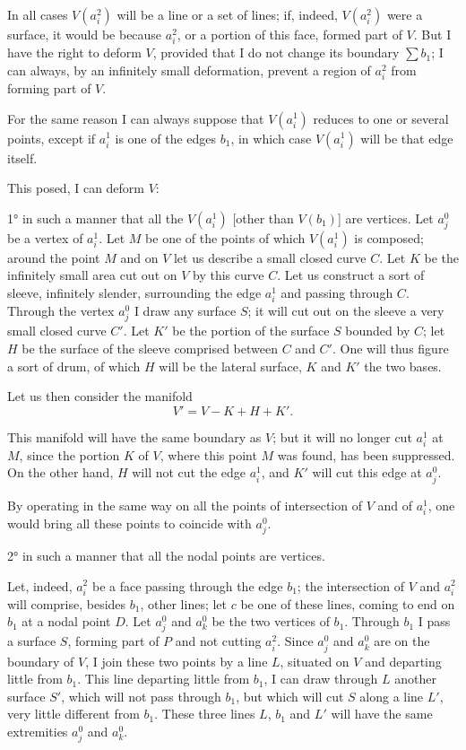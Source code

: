 \documentclass{article}
\begin{document}
In all cases $V(a^{2}_{i})$ will be a line or a set of lines; if, indeed, $V(a^{2}_{i})$ were a surface, it would be because $a^{2}_{i}$, or a portion of this face, formed part of $V$. But I have the right to deform $V$, provided that I do not change its boundary $\displaystyle\sum b_{1}$; I can always, by an infinitely small deformation, prevent a region of $a^{2}_{i}$ from forming part of $V$.

For the same reason I can always suppose that $V(a^{1}_{i})$ reduces to one or several points, except if $a^{1}_{i}$ is one of the edges $b_{1}$, in which case $V(a^{1}_{i})$ will be that edge itself.

This posed, I can deform $V$:

1° in such a manner that all the $V(a^{1}_{i})$ [other than $V(b_{1})$] are vertices. Let $a^{0}_{j}$ be a vertex of $a^{1}_{i}$. Let $M$ be one of the points of which $V(a^{1}_{i})$ is composed; around the point $M$ and on $V$ let us describe a small closed curve $C$. Let $K$ be the infinitely small area cut out on $V$ by this curve $C$. Let us construct a sort of sleeve, infinitely slender, surrounding the edge $a^{1}_{i}$ and passing through $C$. Through the vertex $a^{0}_{j}$ I draw any surface $S$; it will cut out on the sleeve a very small closed curve $C'$. Let $K'$ be the portion of the surface $S$ bounded by $C$; let $H$ be the surface of the sleeve comprised between $C$ and $C'$. One will thus figure a sort of drum, of which $H$ will be the lateral surface, $K$ and $K'$ the two bases.

Let us then consider the manifold
\[ V' = V - K + H + K'. \]

This manifold will have the same boundary as $V$; but it will no longer cut $a^{1}_{i}$ at $M$, since the portion $K$ of $V$, where this point $M$ was found, has been suppressed. On the other hand, $H$ will not cut the edge $a^{1}_{i}$, and $K'$ will cut this edge at $a^{0}_{j}$.


By operating in the same way on all the points of intersection of $V$ and of $a^{1}_{i}$, one would bring all these points to coincide with $a^{0}_{j}$.

2° in such a manner that all the nodal points are vertices.

Let, indeed, $a^{2}_{i}$ be a face passing through the edge $b_{1}$; the intersection of $V$ and $a^{2}_{i}$ will comprise, besides $b_{1}$, other lines; let $c$ be one of these lines, coming to end on $b_{1}$ at a nodal point $D$. Let $a^{0}_{j}$ and $a^{0}_{k}$ be the two vertices of $b_{1}$. Through $b_{1}$ I pass a surface $S$, forming part of $P$ and not cutting $a^{2}_{i}$. Since $a^{0}_{j}$ and $a^{0}_{k}$ are on the boundary of $V$, I join these two points by a line $L$, situated on $V$ and departing little from $b_{1}$. This line departing little from $b_{1}$, I can draw through $L$ another surface $S'$, which will not pass through $b_{1}$, but which will cut $S$ along a line $L'$, very little different from $b_{1}$. These three lines $L$, $b_{1}$ and $L'$ will have the same extremities $a^{0}_{j}$ and $a^{0}_{k}$.
\end{document}

